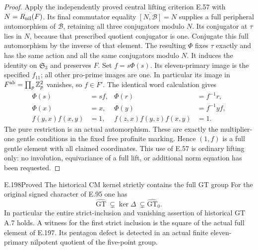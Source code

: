 \begin{proof}
Apply the independently proved central lifting criterion E.57
with \(N=R_{\rm nil}(F)\).  Its final commutator equality
\(\overline{[N,\mathcal B]}=N\) supplies a full peripheral
automorphism of \(\mathcal B\), retaining all three
conjugators modulo \(N\).  Its conjugator at \(\tau\) lies
in \(N\), because that prescribed quotient conjugator is one.
Conjugate this full automorphism by the inverse of that element.
The resulting \(\Phi\) fixes \(\tau\) exactly and has the
same action and all the same conjugators modulo \(N\).
It induces
the identity on \(\mathfrak S_3\) and preserves \(F\).
Set \(f=s\Phi(s)\).  Its eleven-primary image is the
specified \(f_{11}\); all other pro-prime images are one.
In particular its image in
\(F^{\rm ab}=\prod_p\mathbb Z_p^2\) vanishes, so \(f\in F'\).
The identical word calculation gives
\[
\begin{aligned}
\Phi(s)&=sf,& \Phi(r)&=f^{-1}r,\\
\Phi(x)&=x,& \Phi(y)&=f^{-1}yf,\\
f(y,x)f(x,y)&=1,& f(z,x)f(y,z)f(x,y)&=1.
\end{aligned}
\tag{E.197.13}
\]
The pure restriction is an actual automorphism.  These are
exactly the multiplier-one gentle conditions in the fixed
free profinite marking.  Hence \((1,f)\) is a full gentle
element with all claimed coordinates.  This use of E.57 is
ordinary lifting only: no involution, equivariance of a full
lift, or additional norm equation has been requested.
\end{proof}

\begin{result}{E.198}{Proved}
{The historical CM kernel strictly contains the full GT group}
For the original signed character of E.95 one has
\[
\widehat{\mathrm{GT}}\ \subsetneq\ker\Delta
             \ \subsetneq\widehat{\mathrm{GT}}_0.
\tag{E.198.1}
\]
In particular the entire strict-inclusion and vanishing assertion
of historical GT A.7 holds.  A witness for the first strict
inclusion is the square of the actual full element of E.197.
Its pentagon defect is detected in an actual finite
eleven-primary nilpotent quotient of the five-point group.
\end{result}

